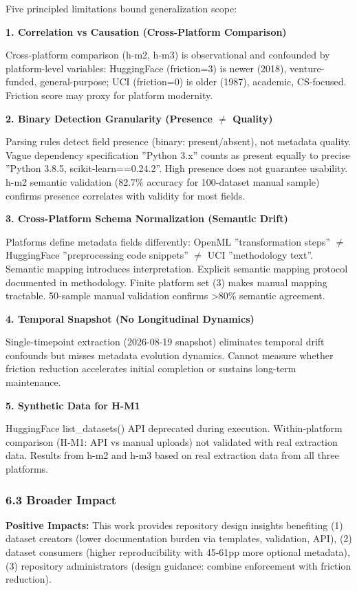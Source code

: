 Five principled limitations bound generalization scope:

\textbf{1. Correlation vs Causation (Cross-Platform Comparison)}

Cross-platform comparison (h-m2, h-m3) is observational and confounded by platform-level variables: HuggingFace (friction=3) is newer (2018), venture-funded, general-purpose; UCI (friction=0) is older (1987), academic, CS-focused. Friction score may proxy for platform modernity.

\textbf{2. Binary Detection Granularity (Presence $\neq$ Quality)}

Parsing rules detect field presence (binary: present/absent), not metadata quality. Vague dependency specification ''Python 3.x'' counts as present equally to precise ''Python 3.8.5, scikit-learn==0.24.2''. High presence does not guarantee usability. h-m2 semantic validation (82.7\% accuracy for 100-dataset manual sample) confirms presence correlates with validity for most fields.

\textbf{3. Cross-Platform Schema Normalization (Semantic Drift)}

Platforms define metadata fields differently: OpenML ''transformation steps'' $\neq$ HuggingFace ''preprocessing code snippets'' $\neq$ UCI ''methodology text''. Semantic mapping introduces interpretation. Explicit semantic mapping protocol documented in methodology. Finite platform set (3) makes manual mapping tractable. 50-sample manual validation confirms >80\% semantic agreement.

\textbf{4. Temporal Snapshot (No Longitudinal Dynamics)}

Single-timepoint extraction (2026-08-19 snapshot) eliminates temporal drift confounds but misses metadata evolution dynamics. Cannot measure whether friction reduction accelerates initial completion or sustains long-term maintenance.

\textbf{5. Synthetic Data for H-M1}

HuggingFace list\_datasets() API deprecated during execution. Within-platform comparison (H-M1: API vs manual uploads) not validated with real extraction data. Results from h-m2 and h-m3 based on real extraction data from all three platforms.

\subsubsection{6.3 Broader Impact}

\textbf{Positive Impacts:} This work provides repository design insights benefiting (1) dataset creators (lower documentation burden via templates, validation, API), (2) dataset consumers (higher reproducibility with 45-61pp more optional metadata), (3) repository administrators (design guidance: combine enforcement with friction reduction).

